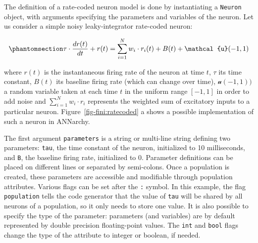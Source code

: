 \documentclass[
  11pt,
  a4paper,
]{scrbook}
\begin{document}
The definition of a rate-coded neuron model is done by instantiating a
\texttt{Neuron} object, with arguments specifying the parameters and
variables of the neuron. Let us consider a simple noisy leaky-integrator
rate-coded neuron:

\begin{equation}\phantomsection\label{eq-fini:noisyleaky}{
\tau \cdot \frac{d r(t)}{dt} + r(t) = \sum_{i=1}^N w_i \cdot r_i(t) + B(t) + \mathcal{u}(-1, 1)
}\end{equation}

where \(r(t)\) is the instantaneous firing rate of the neuron at time
\(t\), \(\tau\) its time constant, \(B(t)\) its baseline firing rate
(which can change over time), \(\mathcal{u}(-1, 1))\) a random variable
taken at each time \(t\) in the uniform range \([-1, 1]\) in order to
add noise and \(\sum_{i=1}^N w_i \cdot r_i\) represents the weighted sum
of excitatory inputs to a particular neuron.
Figure~\ref{fig-fini:ratecoded} a shows a possible implementation of
such a neuron in ANNarchy.

The first argument \texttt{parameters} is a string or multi-line string
defining two parameters: \texttt{tau}, the time constant of the neuron,
initialized to 10 milliseconds, and \texttt{B}, the baseline firing
rate, initialized to 0. Parameter definitions can be placed on different
lines or separated by semi-colons. Once a population is created, these
parameters are accessible and modifiable through population attributes.
Various flags can be set after the \texttt{:} symbol. In this example,
the flag \texttt{population} tells the code generator that the value of
\texttt{tau} will be shared by all neurons of a population, so it only
needs to store one value. It is also possible to specify the type of the
parameter: parameters (and variables) are by default represented by
double precision floating-point values. The \texttt{int} and
\texttt{bool} flags change the type of the attribute to integer or
boolean, if needed.
\end{document}
